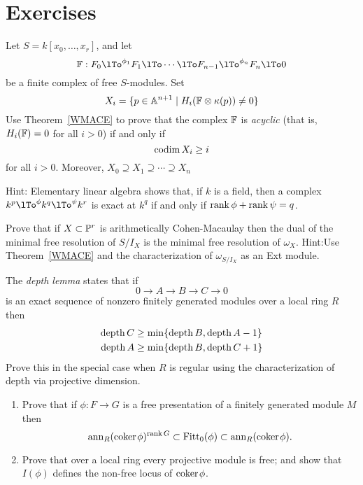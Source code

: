 \section{Exercises}

\begin{exercise}\label{WMACE corollary}
 Let $S = k[x_0,\dots, x_r]$, and let
 $$ 
\FF:  F_0\lTo^{\phi_1}F_1 \lTo \cdots \lTo F_{n-1}\lTo^{\phi_n} F_n\lTo 0
 $$
be a finite complex of free $S$-modules. Set
$$
X_i = \{p\in \mathbb A^{n+1} \mid  H_i({\mathbb F} \otimes \kappa(p)) \neq 0\}
$$
Use Theorem~\ref{WMACE} to prove that the complex ${\mathbb F}$ is \emph{acyclic} (that is, $H_i({\mathbb F}) = 0$ for all $i>0$) if and only if
$$
\operatorname{codim} X_i \geq i
$$
for all $i>0$. Moreover, $X_{0}\supseteq X_{1}\supseteq \cdots \supseteq X_{n}$

Hint: Elementary linear algebra shows that, if $k$ is a field, then a complex $k^p \lTo^{\phi} k^q \lTo^\psi k^r$ is exact at $k^q$ if and
only if $\operatorname{rank} \phi +\operatorname{rank} \psi = q$. 
\end{exercise}

\begin{exercise}
Prove that if $X\subset \mathbb P^r$ is arithmetically Cohen-Macaulay then the dual of the minimal free resolution of $S/I_X$
is the minimal free resolution of $\omega_X$. Hint:Use Theorem~\ref{WMACE} and the characterization of $\omega_{S/I_X}$
as an Ext module.
\end{exercise}

\begin{exercise}
The \emph{depth lemma} states that if 
$$
0\to A\to B\to C \to 0
$$
is an exact sequence of nonzero finitely generated modules over a local ring $R$ then
$$
\begin{aligned}
 \operatorname{depth} C &\geq \min\{\operatorname{depth} B, \operatorname{depth} A-1\}\\
 \operatorname{depth} A & \geq \min\{\operatorname{depth} B, \operatorname{depth} C +1\}
 \end{aligned}
 $$
Prove this in the special case when $R$ is regular using the characterization of depth
 via projective dimension.
\end{exercise}

\begin{exercise}
\begin{enumerate}
 \item Prove that if $\phi: F\to G$ is a free presentation of a finitely generated module $M$
then 
$$
{\rm{ann}}_{R}({\rm{coker}\kern1pt} \phi)^{\operatorname{rank} G}\subset \operatorname{Fitt}_{0}(\phi) \subset {\rm{ann}}_{R}({\rm{coker}\kern1pt} \phi).
$$
\item Prove that over a local ring every projective module is free; and show that 
$I(\phi)$ defines the non-free locus of ${\rm{coker}\kern1pt} \phi$. 
\end{enumerate}
\end{exercise}

